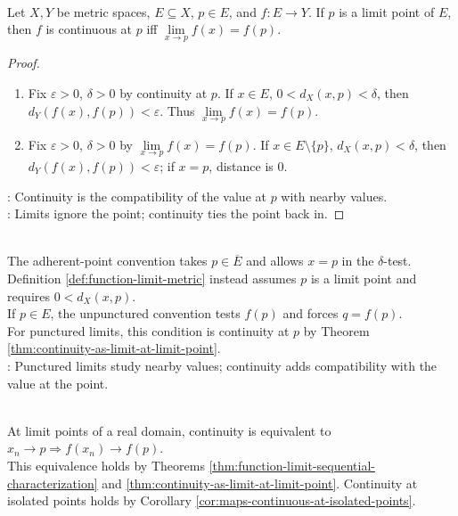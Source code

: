 \begin{theorem} \label{thm:continuity-as-limit-at-limit-point} \\
Let $X,Y$ be metric spaces, $E\subseteq X$, $p\in E$, and $f:E\to Y$. If $p$ is a limit point of $E$, then $f$ is continuous at $p$ iff $\lim\limits_{x\to p}f(x)=f(p)$.
\begin{proof}
\begin{enumerate}[label=\roman*.]
\setlength{\itemsep}{0pt}
\item[$(\Rightarrow)$] Fix $\varepsilon>0$, $\delta>0$ by continuity at $p$. If $x\in E$, $0<d_X(x,p)<\delta$, then $d_Y(f(x),f(p))<\varepsilon$. Thus $\lim\limits_{x\to p}f(x)=f(p)$.
\item[$(\Leftarrow)$] Fix $\varepsilon>0$, $\delta>0$ by $\lim\limits_{x\to p}f(x)=f(p)$. If $x\in E\setminus\{p\}$, $d_X(x,p)<\delta$, then $d_Y(f(x),f(p))<\varepsilon$; if $x=p$, distance is $0$.
\end{enumerate}
: Continuity is the compatibility of the value at $p$ with nearby values.\\
: Limits ignore the point; continuity ties the point back in.
\end{proof}
\end{theorem}

\begin{remark} \label{rem:adherent-function-limits-convention} \\
The adherent-point convention takes $p\in\overline{E}$ and allows $x=p$ in the $\delta$-test.\\
Definition \ref{def:function-limit-metric} instead assumes $p$ is a limit point and requires $0<d_X(x,p)$.\\
If $p\in E$, the unpunctured convention tests $f(p)$ and forces $q=f(p)$.\\
For punctured limits, this condition is continuity at $p$ by Theorem \ref{thm:continuity-as-limit-at-limit-point}.\\
: Punctured limits study nearby values; continuity adds compatibility with the value at the point.
\end{remark}

\begin{remark} \label{rem:sequential-continuity-real-line} \\
At limit points of a real domain, continuity is equivalent to $x_n\to p\Longrightarrow f(x_n)\to f(p)$.\\
This equivalence holds by Theorems \ref{thm:function-limit-sequential-characterization} and \ref{thm:continuity-as-limit-at-limit-point}. Continuity at isolated points holds by Corollary \ref{cor:maps-continuous-at-isolated-points}.
\end{remark}

